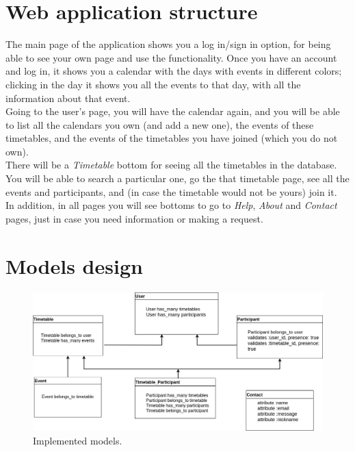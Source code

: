 \section{Web application structure}
\vspace{-5mm}
The main page of the application shows you a log in/sign in option, for being able to see your own page and use the functionality. Once you have an account and log in, it shows you a calendar with the days with events in different colors; clicking in the day it shows you all the events to that day, with all the information about that event.\\
Going to the user's page, you will have the calendar again, and you will be able to list all the calendars you own (and add a new one), the events of these timetables, and the events of the timetables you have joined (which you do not own).\\
There will be a \textit{Timetable} bottom for seeing all the timetables in the database. You will be able to search a particular one, go the that timetable page, see all the events and participants, and (in case the timetable would not be yours) join it.\\
In addition, in all pages you will see bottoms to go to \textit{Help}, \textit{About} and \textit{Contact} pages, just in case you need information or making a request.

\newpage

\section{Models design}
\label{Models}
\vspace{-5mm}
\begin{figure}[H]
	\centering
    \includegraphics[trim={0 0 0 0},clip,width=1\textwidth]{Files/Models.jpg}
    \caption{Implemented models.\cite{draw:io}}
    \label{fig: Models}
\end{figure}

